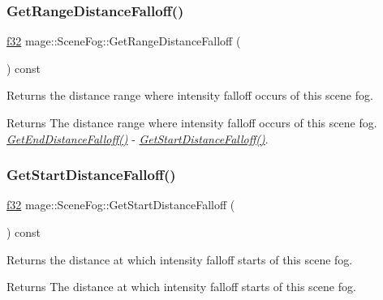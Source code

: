 \subsubsection{\texorpdfstring{Get\+Range\+Distance\+Falloff()}{GetRangeDistanceFalloff()}}
{\footnotesize\ttfamily \hyperlink{namespacemage_a6a44ad388483959dc4dff9f2aef91431}{f32} mage\+::\+Scene\+Fog\+::\+Get\+Range\+Distance\+Falloff (\begin{DoxyParamCaption}{ }\end{DoxyParamCaption}) const\hspace{0.3cm}{\ttfamily [noexcept]}}

Returns the distance range where intensity falloff occurs of this scene fog.

\begin{DoxyReturn}{Returns}
The distance range where intensity falloff occurs of this scene fog. {\itshape \hyperlink{structmage_1_1_scene_fog_adf04c85deb6254e43753d2926fba4189}{Get\+End\+Distance\+Falloff()}} -\/ {\itshape \hyperlink{structmage_1_1_scene_fog_af7679e95c8959d9b502c4256ab7699ba}{Get\+Start\+Distance\+Falloff()}}. 
\end{DoxyReturn}
\hypertarget{structmage_1_1_scene_fog_af7679e95c8959d9b502c4256ab7699ba}{}\label{structmage_1_1_scene_fog_af7679e95c8959d9b502c4256ab7699ba} 
\subsubsection{\texorpdfstring{Get\+Start\+Distance\+Falloff()}{GetStartDistanceFalloff()}}
{\footnotesize\ttfamily \hyperlink{namespacemage_a6a44ad388483959dc4dff9f2aef91431}{f32} mage\+::\+Scene\+Fog\+::\+Get\+Start\+Distance\+Falloff (\begin{DoxyParamCaption}{ }\end{DoxyParamCaption}) const\hspace{0.3cm}{\ttfamily [noexcept]}}

Returns the distance at which intensity falloff starts of this scene fog.

\begin{DoxyReturn}{Returns}
The distance at which intensity falloff starts of this scene fog. 
\end{DoxyReturn}
\hypertarget{structmage_1_1_scene_fog_a2312784458fe9d8e88dcfe5c444866a4}{}\label{structmage_1_1_scene_fog_a2312784458fe9d8e88dcfe5c444866a4} 
